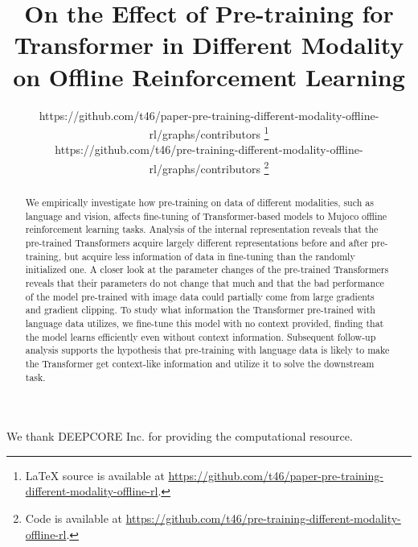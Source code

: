 \documentclass{article}
\title{On the Effect of Pre-training for Transformer in Different Modality on Offline Reinforcement Learning}
\author{
  https://github.com/t46/paper-pre-training-different-modality-offline-rl/graphs/contributors 
  \thanks{
  LaTeX source is available at 
  \href{https://github.com/t46/paper-pre-training-different-modality-offline-rl}{https://github.com/t46/paper-pre-training-different-modality-offline-rl}.
  }\\
  \And
  https://github.com/t46/pre-training-different-modality-offline-rl/graphs/contributors 
  \thanks{
  Code is available at 
  \href{https://github.com/t46/pre-training-different-modality-offline-rl}{https://github.com/t46/pre-training-different-modality-offline-rl}.
  }
}
\begin{document}
\doparttoc %
\faketableofcontents %



\maketitle


\begin{abstract}
  We empirically investigate how pre-training on data of different modalities, such as language and vision, affects fine-tuning of Transformer-based models to Mujoco offline reinforcement learning tasks. Analysis of the internal representation reveals that the pre-trained Transformers acquire largely different representations before and after pre-training, but acquire less information of data in fine-tuning than the randomly initialized one. A closer look at the parameter changes of the pre-trained Transformers reveals that their parameters do not change that much and that the bad performance of the model pre-trained with image data could partially come from large gradients and gradient clipping. To study what information the Transformer pre-trained with language data utilizes, we fine-tune this model with no context provided, finding that the model learns efficiently even without context information. Subsequent follow-up analysis supports the hypothesis that pre-training with language data is likely to make the Transformer get context-like information and utilize it to solve the downstream task.
\end{abstract}








\begin{ack}
We thank DEEPCORE Inc. for providing the computational resource.
\end{ack}



\end{document}
